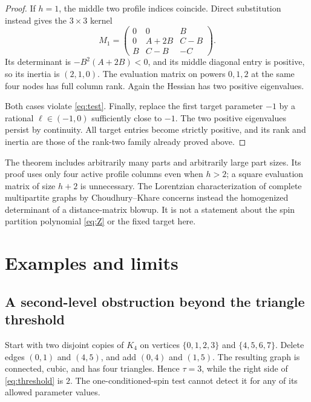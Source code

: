 \documentclass[11pt]{article}
\theoremstyle{remark}
\begin{document}
\begin{proof}
If $h=1$, the middle two profile indices coincide. Direct substitution
instead gives the $3\times3$ kernel
\[
 M_1=\begin{pmatrix}
 0&0&B\\0&A+2B&C-B\\B&C-B&-C
 \end{pmatrix}.
\]
Its determinant is $-B^2(A+2B)<0$, and its middle diagonal entry
is positive, so its inertia is $(2,1,0)$. The evaluation matrix on
powers $0,1,2$ at the same four nodes has full column rank.
Again the Hessian has two positive eigenvalues.

Both cases violate \eqref{eq:test}. Finally, replace the first target
parameter $-1$ by a rational $\ell\in(-1,0)$ sufficiently close to
$-1$. The two positive eigenvalues persist by continuity. All target
entries become strictly positive, and its rank and inertia are those
of the rank-two family already proved above.
\end{proof}

The theorem includes arbitrarily many parts and arbitrarily large part
sizes. Its proof uses only four active profile columns even when
$h>2$; a square evaluation matrix of size $h+2$ is unnecessary.
The Lorentzian characterization of complete multipartite graphs by
Choudhury--Khare \cite[Theorem 2.3]{CK} concerns instead the homogenized
determinant of a distance-matrix blowup. It is not a statement about
the spin partition polynomial \eqref{eq:Z} or the fixed target here.


\section{Examples and limits}
\subsection{A second-level obstruction beyond the triangle threshold}
Start with two disjoint copies of $K_4$ on vertices $\{0,1,2,3\}$
and $\{4,5,6,7\}$. Delete edges $(0,1)$ and $(4,5)$, and add
$(0,4)$ and $(1,5)$. The resulting graph is connected, cubic,
and has four triangles. Hence $\tau=3$, while the right side of
\eqref{eq:threshold} is $2$. The one-conditioned-spin test cannot
detect it for any of its allowed parameter values.
\end{document}
